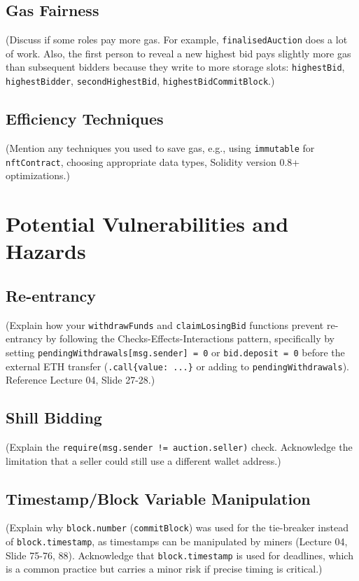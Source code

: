\documentclass[11pt, a4paper]{article}
\begin{document}
\subsection{Gas Fairness}
(Discuss if some roles pay more gas. For example, \texttt{finalisedAuction} does a lot of work. Also, the first person to reveal a new highest bid pays slightly more gas than subsequent bidders because they write to more storage slots: \texttt{highestBid}, \texttt{highestBidder}, \texttt{secondHighestBid}, \texttt{highestBidCommitBlock}.)

\subsection{Efficiency Techniques}
(Mention any techniques you used to save gas, e.g., using \texttt{immutable} for \texttt{nftContract}, choosing appropriate data types, Solidity version 0.8+ optimizations.)


\section{Potential Vulnerabilities and Hazards}
\subsection{Re-entrancy}
(Explain how your \texttt{withdrawFunds} and \texttt{claimLosingBid} functions prevent re-entrancy by following the Checks-Effects-Interactions pattern, specifically by setting \texttt{pendingWithdrawals[msg.sender] = 0} or \texttt{bid.deposit = 0} before the external ETH transfer (\texttt{.call\{value: ...\}} or adding to \texttt{pendingWithdrawals}). Reference Lecture 04, Slide 27-28.)

\subsection{Shill Bidding}
(Explain the \texttt{require(msg.sender != auction.seller)} check. Acknowledge the limitation that a seller could still use a different wallet address.)

\subsection{Timestamp/Block Variable Manipulation}
(Explain why \texttt{block.number} (\texttt{commitBlock}) was used for the tie-breaker instead of \texttt{block.timestamp}, as timestamps can be manipulated by miners (Lecture 04, Slide 75-76, 88). Acknowledge that \texttt{block.timestamp} is used for deadlines, which is a common practice but carries a minor risk if precise timing is critical.)
\end{document}
